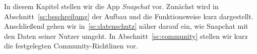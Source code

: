 In diesem Kapitel stellen wir die App \emph{Snapchat} vor. Zun\"achst wird in
Abschnitt~\ref{sc:beschreibung} der Aufbau und die Funktionsweise kurz
dargestellt. Anschlie{\ss}end gehen wir in~\ref{sc:datenschutz} n\"aher darauf
ein, wie Snapchat mit den Daten seiner Nutzer umgeht. In
Abschnitt~\ref{sc:community} stellen wir kurz die festgelegten
Community-Richtlinen vor.
